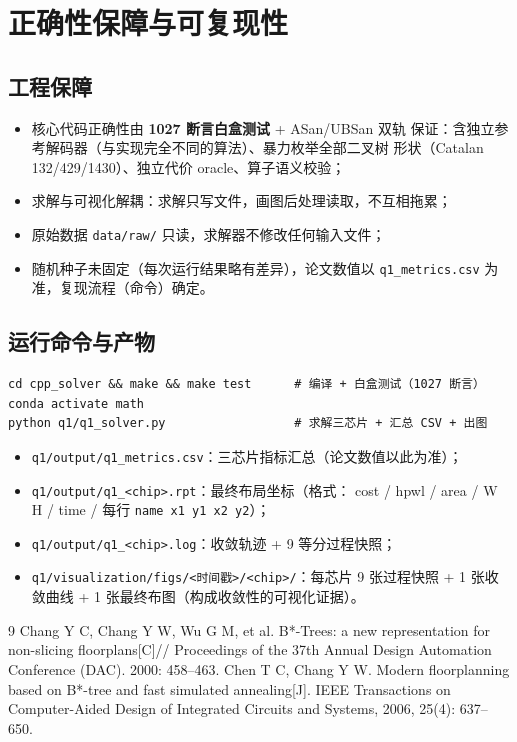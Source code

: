 \documentclass[12pt,a4paper]{article}
\begin{document}
\section{正确性保障与可复现性}

\subsection{工程保障}

\begin{itemize}
    \item 核心代码正确性由 \textbf{1027 断言白盒测试} + ASan/UBSan 双轨
    保证：含独立参考解码器（与实现完全不同的算法）、暴力枚举全部二叉树
    形状（Catalan 132/429/1430）、独立代价 oracle、算子语义校验；
    \item 求解与可视化解耦：求解只写文件，画图后处理读取，不互相拖累；
    \item 原始数据 \texttt{data/raw/} 只读，求解器不修改任何输入文件；
    \item 随机种子未固定（每次运行结果略有差异），论文数值以
    \texttt{q1\_metrics.csv} 为准，复现流程（命令）确定。
\end{itemize}

\subsection{运行命令与产物}

{\small
\begin{verbatim}
cd cpp_solver && make && make test      # 编译 + 白盒测试（1027 断言）
conda activate math
python q1/q1_solver.py                  # 求解三芯片 + 汇总 CSV + 出图
\end{verbatim}
}

\begin{itemize}
    \item \texttt{q1/output/q1\_metrics.csv}：三芯片指标汇总（论文数值以此为准）；
    \item \texttt{q1/output/q1\_<chip>.rpt}：最终布局坐标（格式：
    cost / hpwl / area / W H / time / 每行 \texttt{name x1 y1 x2 y2}）；
    \item \texttt{q1/output/q1\_<chip>.log}：收敛轨迹 + 9 等分过程快照；
    \item \texttt{q1/visualization/figs/<时间戳>/<chip>/}：每芯片
    9 张过程快照 + 1 张收敛曲线 + 1 张最终布图（构成收敛性的可视化证据）。
\end{itemize}

\begin{thebibliography}{9}
 Chang Y C, Chang Y W, Wu G M, et al. B*-Trees: a new
  representation for non-slicing floorplans[C]// Proceedings of the 37th
  Annual Design Automation Conference (DAC). 2000: 458--463.
 Chen T C, Chang Y W. Modern floorplanning based on B*-tree
  and fast simulated annealing[J]. IEEE Transactions on Computer-Aided
  Design of Integrated Circuits and Systems, 2006, 25(4): 637--650.
\end{thebibliography}
\end{document}
